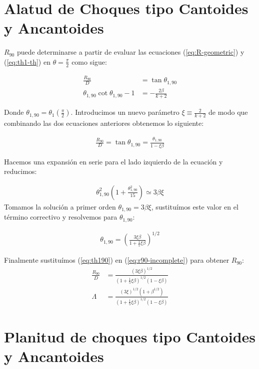 \section{Alatud de Choques tipo Cantoides y Ancantoides}
$R_{90}$ puede determinarse a partir de evaluar las ecuaciones (\ref{eq:R-geometric}) y (\ref{eq:th1-th}) en $\theta=\frac{\pi}{2}$
como sigue:

\begin{align}
  \frac{R_{90}}{D} &= \tan\theta_{1,90} \\
  \theta_{1,90}\cot\theta_{1,90} -1 &=  - \frac{2\beta}{k+2}
\end{align}

Donde $\theta_{1,90} = \theta_1\left(\frac{\pi}{2}\right)$. Introducimos un nuevo parámetro $\xi \equiv \frac{2}{k+2}$ de modo que
combinando las dos ecuaciones anteriores obtenemos lo siguiente:

\begin{align}
  \frac{R_{90}}{D} = \tan\theta_{1,90} = \frac{\theta_{1,90}}{1-\xi\beta} \label{eq:r90-incomplete}
\end{align}

Hacemos una expansión en serie para el lado izquierdo de la ecuación y reducimos:

\begin{align}
  \theta^2_{1,90}\left(1 + \frac{\theta^2_{1,90}}{15}\right) \simeq 3\beta\xi
\end{align}
Tomamos la solución a primer orden $\theta_{1,90} = 3\beta\xi$,  sustituímos este valor en el término correctivo y resolvemos para
$\theta_{1,90}$:

\begin{align}
  \theta_{1,90} = \left(\frac{3\xi\beta}{1+\frac{1}{5}\xi\beta}\right)^{1/2} \label{eq:th190}
\end{align}

Finalmente sustituímos (\ref{eq:th190}) en (\ref{eq:r90-incomplete}) para obtener $R_{90}$:
\begin{align}
  \frac{R_{90}}{D} &= \frac{\left(3\xi\beta\right)^{1/2}}{\left(1+\frac{1}{5}\xi\beta\right)^{1/2}\left(1-\xi\beta\right)} \\
  \Lambda &= \frac{\left(3\xi\right)^{1/2}\left(1+\beta^{1/2}\right)}
                   {\left(1+\frac{1}{5}\xi\beta\right)^{1/2}\left(1-\xi\beta\right)} 
\end{align}

\section{Planitud de choques tipo Cantoides y Ancantoides}

